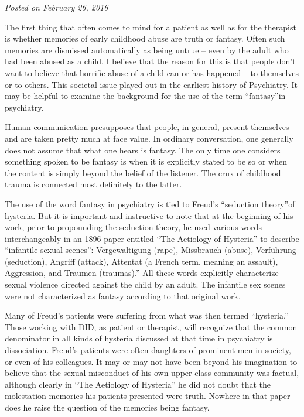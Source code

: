 \documentclass[]{book}
\begin{document}
\emph{Posted on February 26, 2016}

The first thing that often comes to mind for a patient as well as for the therapist is whether memories of early childhood abuse are truth or fantasy. Often such memories are dismissed automatically as being untrue -- even by the adult who had been abused as a child. I believe that the reason for this is that people don't want to believe that horrific abuse of a child can or has happened -- to themselves or to others. This societal issue played out in the earliest history of Psychiatry. It may be helpful to examine the background for the use of the term ``fantasy''in psychiatry.

Human communication presupposes that people, in general, present themselves and are taken pretty much at face value. In ordinary conversation, one generally does not assume that what one hears is fantasy. The only time one considers something spoken to be fantasy is when it is explicitly stated to be so or when the content is simply beyond the belief of the listener. The crux of childhood trauma is connected most definitely to the latter.

The use of the word fantasy in psychiatry is tied to Freud's ``seduction theory''of hysteria. But it is important and instructive to note that at the beginning of his work, prior to propounding the seduction theory, he used various words interchangeably in an 1896 paper entitled ``The Aetiology of Hysteria'' to describe ``infantile sexual scenes'': Vergewaltigung (rape), Missbrauch (abuse), Verführung (seduction), Angriff (attack), Attentat (a French term, meaning an assault), Aggression, and Traumen (traumas).'' All these words explicitly characterize sexual violence directed against the child by an adult. The infantile sex scenes were not characterized as fantasy according to that original work.

Many of Freud's patients were suffering from what was then termed ``hysteria.'' Those working with DID, as patient or therapist, will recognize that the common denominator in all kinds of hysteria discussed at that time in psychiatry is dissociation. Freud's patients were often daughters of prominent men in society, or even of his colleagues. It may or may not have been beyond his imagination to believe that the sexual misconduct of his own upper class community was factual, although clearly in ``The Aetiology of Hysteria'' he did not doubt that the molestation memories his patients presented were truth. Nowhere in that paper does he raise the question of the memories being fantasy.
\end{document}
